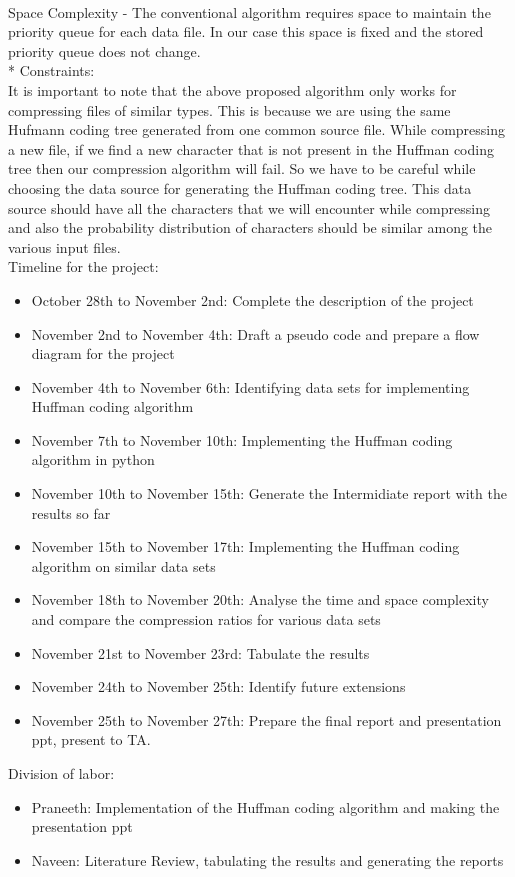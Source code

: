 {\\
Space Complexity - The conventional algorithm requires space to maintain the priority queue for each data file. In our case this space is fixed and the stored priority queue does not change.
\\*
Constraints:
\\
It is important to note that the above proposed algorithm only works for compressing files of similar types. This is because we are using the same Hufmann coding tree generated from one common source file. While compressing a new file, if we find a new character that is not present in the Huffman coding tree then our compression algorithm will fail. So we have to be careful while choosing the data source for generating the Huffman coding tree. This data source should have all the characters that we will encounter while compressing and also the probability distribution of characters should be similar among the various input files.
\\
Timeline for the project:
\begin{itemize} 
\item{October 28th to November 2nd: Complete the description of the project} 
\item{November 2nd to November 4th: Draft a pseudo code and prepare a flow diagram for the project}
\item{November 4th to November 6th: Identifying data sets for implementing Huffman coding algorithm}
\item{November 7th to November 10th: Implementing the Huffman coding algorithm in python}
\item{November 10th to November 15th: Generate the Intermidiate report with the results so far}
\item{November 15th to November 17th: Implementing the Huffman coding algorithm on similar data sets}
\item{November 18th to November 20th: Analyse the time and space complexity and compare the compression ratios for various data sets}
\item{November 21st to November 23rd: Tabulate the results}
\item{November 24th to November 25th: Identify future extensions}
\item{November 25th to November 27th: Prepare the final report and presentation ppt, present to TA.}
\end{itemize}
Division of labor:
\begin{itemize}
\item {Praneeth: Implementation of the Huffman coding algorithm and making the presentation ppt}
\item {Naveen: Literature Review, tabulating the results and generating the reports}
\end{itemize}
}





